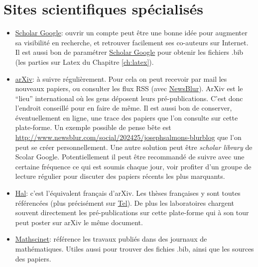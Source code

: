 \section{Sites scientifiques spécialisés}



\begin{itemize}
\item \href{http://scholar.google.com}{Scholar Google}:
ouvrir un compte peut être une bonne idée pour augmenter sa visibilité en recherche,
et retrouver facilement ses co-auteurs sur Internet.
Il est aussi bon de paramétrer \href{http://scholar.google.com}{Scholar Google} pour
obtenir les fichiers  .bib (\lcf les parties sur Latex du Chapitre \ref{ch:latex}).

\item \href{http://arxiv.org/}{arXiv}:
\`a suivre régulièrement. Pour cela on peut recevoir par mail les nouveaux papiers, ou consulter les flux RSS (\eg avec 
\href{https://www.newsblur.com/}{NewsBlur}). 
ArXiv est le ``lieu'' international
où les gens déposent leurs pré-publications. C'est donc l'endroit conseillé pour en faire
de même. Il est aussi bon de conserver, éventuellement en ligne, une trace des papiers que
l'on consulte sur cette plate-forme. Un exemple possible de pense bête est 
\href{http://www.newsblur.com/social/202425/josephsalmons-blurblog}
{http://www.newsblur.com/social/202425/josephsalmons-blurblog}
que l'on peut se créer personnellement. Une autre solution peut \^etre 
\textit{scholar library} de Scolar Google. Potentiellement il peut être recommandé de suivre avec une 
certaine fréquence ce qui est soumis
chaque jour, voir profiter d'un groupe de lecture régulier pour discuter des papiers récents les plus
marquants.

\item \href{http://hal.archives-ouvertes.fr/}{Hal}: c'est l'équivalent français d'arXiv.
Les thèses françaises y sont toutes référencées (plus pr\'ecis\'ement sur \href{http://tel.archives-ouvertes.fr/}{Tel}). 
De plus les laboratoires chargent souvent directement
les pré-publications sur cette plate-forme qui \`a son tour peut poster sur arXiv le m\^eme document.


\item \href{http://www.ams.org/mathscinet/}{Mathscinet}: référence les travaux publiés dans
des journaux de mathématiques. Utiles aussi pour trouver des fichies .bib, ainsi que les sources
des papiers. 

\end{itemize}





